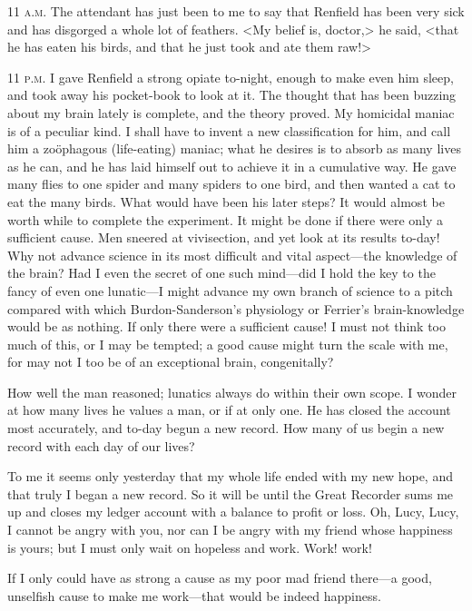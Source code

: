 \begin{diary}{11 \textsc{a.m.}}
The attendant has just been to me to say that Renfield has been very sick and has disgorged a whole lot of feathers. <My belief is, doctor,> he said, <that he has eaten his birds, and that he just took and ate them raw!>
\end{diary}
 
\begin{diary}{11 \textsc{p.m.}}
I gave Renfield a strong opiate to-night, enough to make even him sleep, and took away his pocket-book to look at it. The thought that has been buzzing about my brain lately is complete, and the theory proved. My homicidal maniac is of a peculiar kind. I shall have to invent a new classification for him, and call him a zoöphagous (life-eating) maniac; what he desires is to absorb as many lives as he can, and he has laid himself out to achieve it in a cumulative way. He gave many flies to one spider and many spiders to one bird, and then wanted a cat to eat the many birds. What would have been his later steps? It would almost be worth while to complete the experiment. It might be done if there were only a sufficient cause. Men sneered at vivisection, and yet look at its results to-day! Why not advance science in its most difficult and vital aspect—the knowledge of the brain? Had I even the secret of one such mind—did I hold the key to the fancy of even one lunatic—I might advance my own branch of science to a pitch compared with which Burdon-Sanderson's physiology or Ferrier's brain-knowledge would be as nothing. If only there were a sufficient cause! I must not think too much of this, or I may be tempted; a good cause might turn the scale with me, for may not I too be of an exceptional brain, congenitally?

How well the man reasoned; lunatics always do within their own scope. I wonder at how many lives he values a man, or if at only one. He has closed the account most accurately, and to-day begun a new record. How many of us begin a new record with each day of our lives?

To me it seems only yesterday that my whole life ended with my new hope, and that truly I began a new record. So it will be until the Great Recorder sums me up and closes my ledger account with a balance to profit or loss. Oh, Lucy, Lucy, I cannot be angry with you, nor can I be angry with my friend whose happiness is yours; but I must only wait on hopeless and work. Work! work!

If I only could have as strong a cause as my poor mad friend there—a good, unselfish cause to make me work—that would be indeed happiness.
\end{diary}

